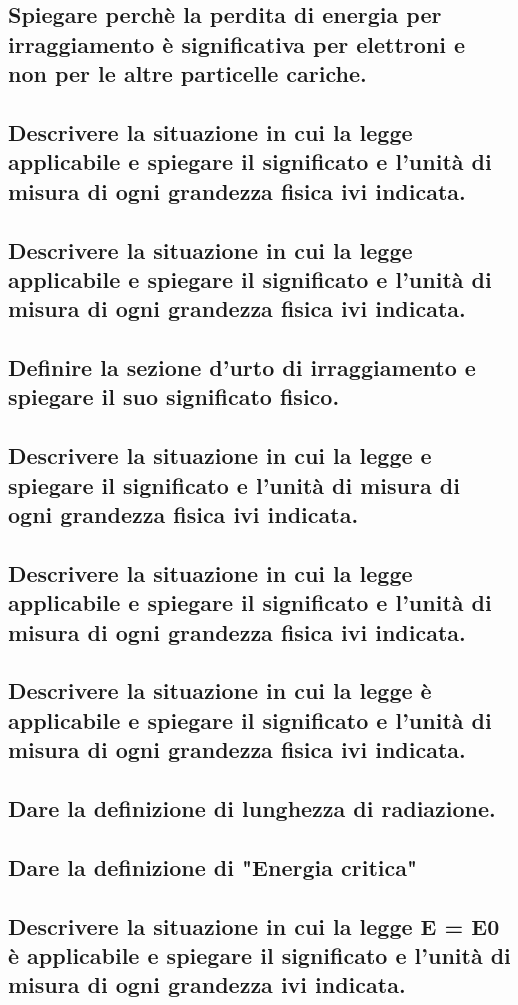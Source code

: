 \subsection[]{Spiegare perchè la perdita di energia per irraggiamento è significativa per elettroni e non per le altre particelle cariche.
}
\subsection[]{Descrivere la situazione in cui la legge
applicabile e spiegare il significato e l'unità di misura di ogni grandezza fisica ivi
indicata.
}
\subsection[]{Descrivere la situazione in cui la legge
applicabile e spiegare il significato e l'unità di misura di ogni grandezza fisica ivi
indicata.
}
\subsection[]{Definire la sezione d'urto di irraggiamento e spiegare il suo significato fisico.
}
\subsection[]{Descrivere la situazione in cui la legge
e spiegare il significato e l'unità di misura di ogni grandezza fisica ivi indicata.
}
\subsection[]{Descrivere la situazione in cui la legge
applicabile e spiegare il significato e l'unità di misura di ogni grandezza fisica ivi
indicata.
}
\subsection[]{Descrivere la situazione in cui la legge
 è applicabile e spiegare il significato e l'unità di misura di ogni grandezza fisica ivi indicata.
}
\subsection[]{Dare la definizione di lunghezza di radiazione.
}
\subsection[]{Dare la definizione di "Energia critica"
}
\subsection[]{Descrivere la situazione in cui la legge E = E0 
 è applicabile e spiegare il significato e l'unità di misura di ogni grandezza ivi indicata.
}
